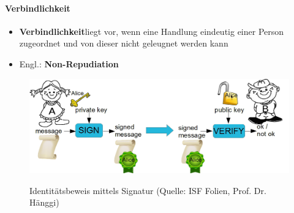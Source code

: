 \paragraph*{Verbindlichkeit}\label{par:Non-Repudiation}
\begin{itemize}
    \item \textbf{Verbindlichkeit}liegt vor, wenn eine Handlung eindeutig einer Person zugeordnet und von dieser nicht geleugnet werden kann
    \item Engl.: \textbf{Non-Repudiation}
\end{itemize}
\begin{figure}[H]
    \begin{center}
    \label{pic:Signature}
    \includegraphics[width=\textwidth]{images/sign1.png}
    \caption{Identitätsbeweis mittels Signatur (Quelle: ISF Folien, Prof. Dr. Hänggi)}
    \end{center}
\end{figure}

